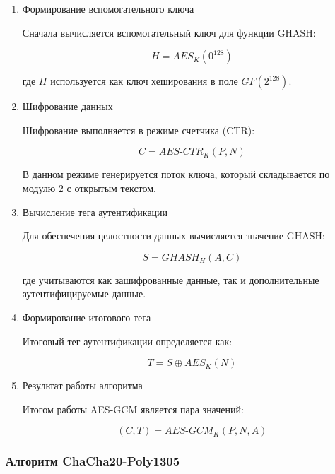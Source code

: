 \documentclass[14pt, a4paper]{extarticle}
\begin{document}
	\begin{enumerate}

	\item Формирование вспомогательного ключа
	
	Сначала вычисляется вспомогательный ключ для функции GHASH:
	
	\begin{equation}
		H = AES_K(0^{128})
	\end{equation}
	
	где $H$ используется как ключ хеширования в поле $GF(2^{128})$.
	
	\item Шифрование данных
	
	Шифрование выполняется в режиме счетчика (CTR):
	
	\begin{equation}
		C = AES\text{-}CTR_K(P, N)
	\end{equation}
	
	В данном режиме генерируется поток ключа, который складывается по модулю 2 с открытым текстом.
	
	\item Вычисление тега аутентификации
	
	Для обеспечения целостности данных вычисляется значение GHASH:
	
	\begin{equation}
		S = GHASH_H(A, C)
	\end{equation}
	
	где учитываются как зашифрованные данные, так и дополнительные аутентифицируемые данные.
	
	\item Формирование итогового тега
	
	Итоговый тег аутентификации определяется как:
	
	\begin{equation}
		T = S \oplus AES_K(N)
	\end{equation}
	
	\item Результат работы алгоритма
	
	Итогом работы AES-GCM является пара значений:
	
	\begin{equation}
		(C, T) = AES\text{-}GCM_K(P, N, A)
	\end{equation}
	
	\end{enumerate}
	
	\subsubsection{Алгоритм ChaCha20-Poly1305}
	
\end{document}
